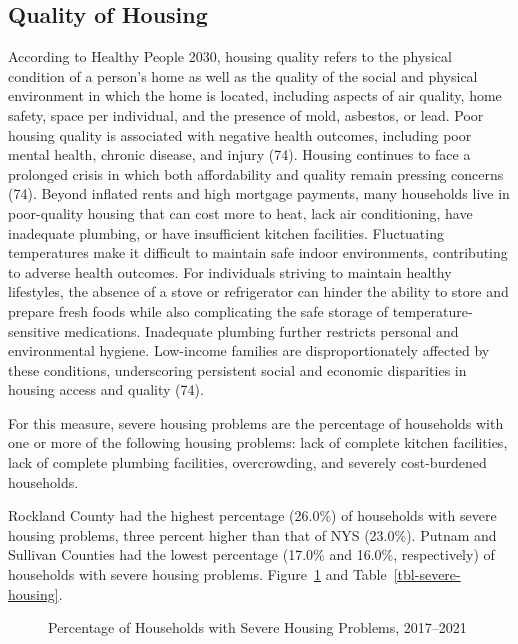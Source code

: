 \documentclass[
  english,
  letterpaper,
]{report}
\begin{document}
\subsection{Quality of Housing}\label{quality-of-housing}

According to Healthy People 2030, housing quality refers to the physical
condition of a person's home as well as the quality of the social and
physical environment in which the home is located, including aspects of
air quality, home safety, space per individual, and the presence of
mold, asbestos, or lead. Poor housing quality is associated with
negative health outcomes, including poor mental health, chronic disease,
and injury (74). Housing continues to face a prolonged crisis in which
both affordability and quality remain pressing concerns (74). Beyond
inflated rents and high mortgage payments, many households live in
poor-quality housing that can cost more to heat, lack air conditioning,
have inadequate plumbing, or have insufficient kitchen facilities.
Fluctuating temperatures make it difficult to maintain safe indoor
environments, contributing to adverse health outcomes. For individuals
striving to maintain healthy lifestyles, the absence of a stove or
refrigerator can hinder the ability to store and prepare fresh foods
while also complicating the safe storage of temperature-sensitive
medications. Inadequate plumbing further restricts personal and
environmental hygiene. Low-income families are disproportionately
affected by these conditions, underscoring persistent social and
economic disparities in housing access and quality (74).

For this measure, severe housing problems are the percentage of
households with one or more of the following housing problems: lack of
complete kitchen facilities, lack of complete plumbing facilities,
overcrowding, and severely cost-burdened households.

Rockland County had the highest percentage (26.0\%) of households with
severe housing problems, three percent higher than that of NYS (23.0\%).
Putnam and Sullivan Counties had the lowest percentage (17.0\% and
16.0\%, respectively) of households with severe housing problems.
Figure~\ref{fig-severe-housing} and Table~\ref{tbl-severe-housing}.

\begin{figure}


\caption{\label{fig-severe-housing}Percentage of Households with Severe
Housing Problems, 2017--2021}

\end{figure}%
\end{document}

